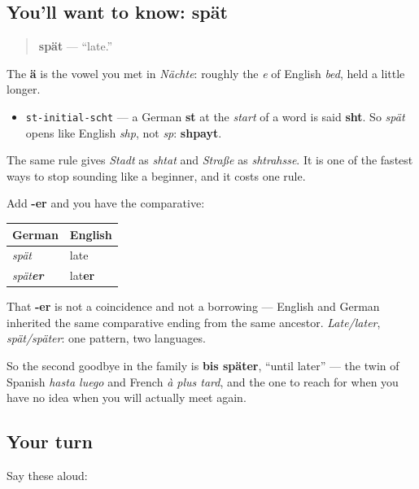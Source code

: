 \subsection*{You'll want to know: spät}
\begin{quote}
\textbf{spät} — \textquotedblleft{}late.\textquotedblright{}
\end{quote}

The \textbf{ä} is the vowel you met in \emph{Nächte}: roughly the \emph{e} of English \emph{bed}, held a little longer.

\begin{sounds}
\begin{itemize}
\raggedright
  \item \texttt{st-initial-scht} — a German \textbf{st} at the \emph{start} of a word is said \textbf{sht}. So \emph{spät} opens like English \emph{shp}, not \emph{sp}: \textbf{shpayt}.
\end{itemize}

The same rule gives \emph{Stadt} as \emph{shtat} and \emph{Straße} as \emph{shtrahsse}. It is one of the fastest ways to stop sounding like a beginner, and it costs one rule.
\end{sounds}

\begin{cousinweb}
Add \textbf{-er} and you have the comparative:

\noindent
\begin{tabularx}{\linewidth}{@{}>{\raggedright\arraybackslash}X>{\raggedright\arraybackslash}X@{}}
\toprule
\textbf{German} & \textbf{English} \\
\midrule
\emph{spät} & late \\
\emph{spät\textbf{er}} & lat\textbf{er} \\
\bottomrule
\end{tabularx}

That \textbf{-er} is not a coincidence and not a borrowing — English and German inherited the same comparative ending from the same ancestor. \emph{Late/later}, \emph{spät/später}: one pattern, two languages.

So the second goodbye in the family is \textbf{bis später}, \textquotedblleft{}until later\textquotedblright{} — the twin of Spanish \emph{hasta luego} and French \emph{à plus tard}, and the one to reach for when you have no idea when you will actually meet again.
\end{cousinweb}

\subsection*{Your turn}
Say these aloud:

